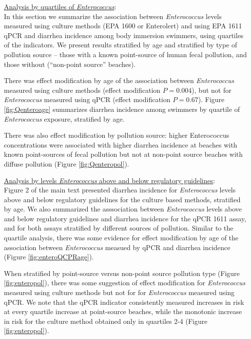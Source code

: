 \documentclass[12pt]{article}\usepackage[]{graphicx}\usepackage[]{color}
\begin{document}
\underline{Analysis by quartiles of \textit{Enterococcus}}: \\
In this section we summarize the association between \emph{Enterococcus} levels measured using culture methods (EPA 1600 or Enterolert) and using EPA 1611 qPCR and diarrhea incidence among body immersion swimmers, using quartiles of the indicators.  We present results stratified by age and stratified by type of pollution source -- those with a known point-source of human fecal pollution, and those without (``non-point source'' beaches).  

There was effect modification by age of the association between \textit{Enterococcus} measured using culture methods (effect modification $P=0.004$), but not for \textit{Enterococcus} measured using qPCR (effect modification $P=0.67$).  Figure  \ref{fig:Qenteroage} summarizes diarrhea incidence among swimmers by quartile of \textit{Enterococcus} exposure, stratified by age.

There was also effect modification by pollution source: higher Enterococcus concentrations were associated with higher diarrhea incidence at beaches with known point-sources of fecal pollution but not at non-point source beaches with diffuse pollution (Figure \ref{fig:Qenteropol}).

\medskip
\noindent \underline{Analysis by levels \textit{Enterococcus} above and below regulatory guidelines}: \\
Figure 2 of the main text presented diarrhea incidence for \textit{Enterococcus} levels above and below regulatory guidelines for the culture based methods, stratified by age. We also summarized the asssociation between \emph{Enterococcus} levels above and below regulatory guidelines and diarrhea incidence for the qPCR 1611 assay, and for both assays stratified by different sources of pollution. Similar to the quartile analysis, there was some evidence for effect modification by age of the association between \textit{Enterococcus} measued by qPCR and diarrhea incidence  (Figure \ref{fig:enteroQCPRage}).  

When stratified by point-source versus non-point source pollution type (Figure \ref{fig:enteropol}), there was some suggestion of effect modification for \textit{Enterococcus} measured using culture methods but not for for \textit{Enterococcus} measured using qPCR. We note that the qPCR indicator consistently measured increases in risk at every quartile increase at point-source beaches, while the monotonic increase in risk for the culture method obtained only in quartiles 2-4 (Figure \ref{fig:enteropol}).
\end{document}
